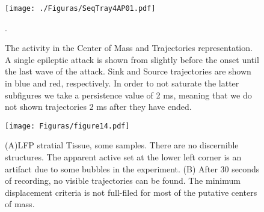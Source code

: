 
\begin{figure}[h!]
   \captionsetup{singlelinecheck=off} 
  \texttt{[image: ./Figuras/SeqTray4AP01.pdf]}
  \caption[test]{
    The activity in the Center of Mass and Trajectories representation.
    A single epileptic attack is shown from slightly before the onset until the
    last wave of the attack. Sink and Source trajectories are shown in blue
    and red, respectively. In order to not saturate the latter subfigures
    we take a persistence value of 2 ms, meaning that we do not shown
    trajectories 2 ms after they have ended.}\label{tray4ap}.
 \end{figure}



\begin{figure}[h!]
  \centering
 \captionsetup{singlelinecheck=off} 
  \texttt{[image: Figuras/figure14.pdf]}
  \caption[test]{
    (A)LFP stratial Tissue, some samples. There are no discernible
    structures. The apparent active set at the lower left corner
    is an artifact due to some bubbles in the experiment.
    (B) After 30 seconds of recording, no visible trajectories can be found. The minimum displacement criteria is not full-filed for most of the putative centers of mass.}
  \label{cuadestriado}
\end{figure}



